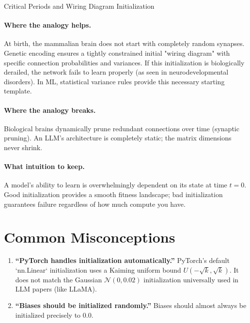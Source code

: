 \begin{analogybox}{Critical Periods and Wiring Diagram Initialization}
  \paragraph{Where the analogy helps.}
  At birth, the mammalian brain does not start with completely random synapses. Genetic encoding ensures a tightly constrained initial "wiring diagram" with specific connection probabilities and variances. If this initialization is biologically derailed, the network fails to learn properly (as seen in neurodevelopmental disorders). In ML, statistical variance rules provide this necessary starting template.

  \paragraph{Where the analogy breaks.}
  Biological brains dynamically prune redundant connections over time (synaptic pruning). An LLM's architecture is completely static; the matrix dimensions never shrink. 

  \paragraph{What intuition to keep.}
  A model's ability to learn is overwhelmingly dependent on its state at time $t=0$. Good initialization provides a smooth fitness landscape; bad initialization guarantees failure regardless of how much compute you have.
\end{analogybox}


\section{Common Misconceptions}
\label{ch:12:sec:misconceptions}

\begin{enumerate}
  \item \textbf{``PyTorch handles initialization automatically.''} PyTorch's default `nn.Linear` initialization uses a Kaiming uniform bound $U(-\sqrt{k}, \sqrt{k})$. It does not match the Gaussian $\mathcal{N}(0, 0.02)$ initialization universally used in LLM papers (like LLaMA). 
  \item \textbf{``Biases should be initialized randomly.''} Biases should almost always be initialized precisely to $0.0$.
\end{enumerate}


